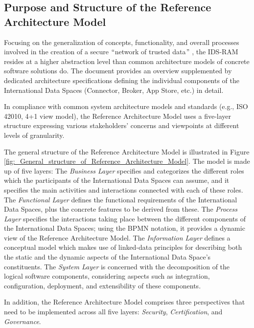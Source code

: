 \subsection{Purpose and Structure of the Reference Architecture Model}\label{subsec:purpose_of_ram}
Focusing on the generalization of concepts, functionality, and overall processes involved in the creation of a secure $``$network of trusted data$"$ , the IDS-RAM resides at a higher abstraction level than common architecture models of concrete software solutions do. The document provides an overview supplemented by dedicated architecture specifications defining the individual components of the International Data Spaces (Connector, Broker, App Store, etc.) in detail.

In compliance with common system architecture models and standards (e.g., ISO 42010, 4+1 view model), the Reference Architecture Model uses a five-layer structure expressing various stakeholders’ concerns and viewpoints at different levels of granularity.

The general structure of the Reference Architecture Model is illustrated in Figure \ref{fig:_General_structure_of_Reference_Architecture_Model}. The model is made up of five layers: The \textit{Business Layer} specifies and categorizes the different roles which the participants of the International Data Spaces can assume, and it specifies the main activities and interactions connected with each of these roles. The \textit{Functional Layer} defines the functional requirements of the International Data Spaces, plus the concrete features to be derived from these. The \textit{Process Layer} specifies the interactions taking place between the different components of the International Data Spaces; using the BPMN notation, it provides a dynamic view of the Reference Architecture Model. The \textit{Information Layer} defines a conceptual model which makes use of linked-data principles for describing both the static and the dynamic aspects of the International Data Space’s constituents. The \textit{System Layer} is concerned with the decomposition of the logical software components, considering aspects such as integration, configuration, deployment, and extensibility of these components.

In addition, the Reference Architecture Model comprises three perspectives that need to be implemented across all five layers: \textit{Security}, \textit{Certification}, and \textit{Governance}. 




